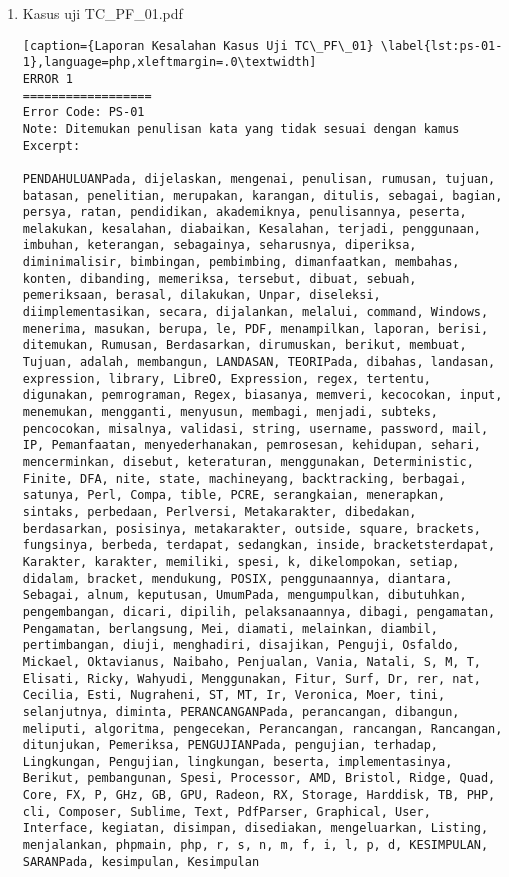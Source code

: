 \begin{enumerate}

	\item Kasus uji TC\_PF\_01.pdf
	
\begin{lstlisting}[caption={Laporan Kesalahan Kasus Uji TC\_PF\_01}	\label{lst:ps-01-1},language=php,xleftmargin=.0\textwidth]
ERROR 1
==================
Error Code: PS-01
Note: Ditemukan penulisan kata yang tidak sesuai dengan kamus
Excerpt: 

PENDAHULUANPada, dijelaskan, mengenai, penulisan, rumusan, tujuan, batasan, penelitian, merupakan, karangan, ditulis, sebagai, bagian, persya, ratan, pendidikan, akademiknya, penulisannya, peserta, melakukan, kesalahan, diabaikan, Kesalahan, terjadi, penggunaan, imbuhan, keterangan, sebagainya, seharusnya, diperiksa, diminimalisir, bimbingan, pembimbing, dimanfaatkan, membahas, konten, dibanding, memeriksa, tersebut, dibuat, sebuah, pemeriksaan, berasal, dilakukan, Unpar, diseleksi, diimplementasikan, secara, dijalankan, melalui, command, Windows, menerima, masukan, berupa, le, PDF, menampilkan, laporan, berisi, ditemukan, Rumusan, Berdasarkan, dirumuskan, berikut, membuat, Tujuan, adalah, membangun, LANDASAN, TEORIPada, dibahas, landasan, expression, library, LibreO, Expression, regex, tertentu, digunakan, pemrograman, Regex, biasanya, memveri, kecocokan, input, menemukan, mengganti, menyusun, membagi, menjadi, subteks, pencocokan, misalnya, validasi, string, username, password, mail, IP, Pemanfaatan, menyederhanakan, pemrosesan, kehidupan, sehari, mencerminkan, disebut, keteraturan, menggunakan, Deterministic, Finite, DFA, nite, state, machineyang, backtracking, berbagai, satunya, Perl, Compa, tible, PCRE, serangkaian, menerapkan, sintaks, perbedaan, Perlversi, Metakarakter, dibedakan, berdasarkan, posisinya, metakarakter, outside, square, brackets, fungsinya, berbeda, terdapat, sedangkan, inside, bracketsterdapat, Karakter, karakter, memiliki, spesi, k, dikelompokan, setiap, didalam, bracket, mendukung, POSIX, penggunaannya, diantara, Sebagai, alnum, keputusan, UmumPada, mengumpulkan, dibutuhkan, pengembangan, dicari, dipilih, pelaksanaannya, dibagi, pengamatan, Pengamatan, berlangsung, Mei, diamati, melainkan, diambil, pertimbangan, diuji, menghadiri, disajikan, Penguji, Osfaldo, Mickael, Oktavianus, Naibaho, Penjualan, Vania, Natali, S, M, T, Elisati, Ricky, Wahyudi, Menggunakan, Fitur, Surf, Dr, rer, nat, Cecilia, Esti, Nugraheni, ST, MT, Ir, Veronica, Moer, tini, selanjutnya, diminta, PERANCANGANPada, perancangan, dibangun, meliputi, algoritma, pengecekan, Perancangan, rancangan, Rancangan, ditunjukan, Pemeriksa, PENGUJIANPada, pengujian, terhadap, Lingkungan, Pengujian, lingkungan, beserta, implementasinya, Berikut, pembangunan, Spesi, Processor, AMD, Bristol, Ridge, Quad, Core, FX, P, GHz, GB, GPU, Radeon, RX, Storage, Harddisk, TB, PHP, cli, Composer, Sublime, Text, PdfParser, Graphical, User, Interface, kegiatan, disimpan, disediakan, mengeluarkan, Listing, menjalankan, phpmain, php, r, s, n, m, f, i, l, p, d, KESIMPULAN, SARANPada, kesimpulan, Kesimpulan
\end{lstlisting}
	

\end{enumerate}
